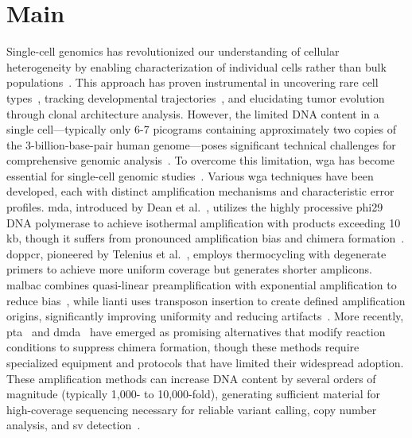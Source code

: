 \documentclass[pdflatex,sn-nature,lineno]{sn-jnl}%
\theoremstyle{thmstyleone}%
\theoremstyle{thmstyletwo}%
\theoremstyle{thmstylethree}%
\begin{document}
\maketitle

\section*{Main}\label{sec:main}

Single-cell genomics has revolutionized our understanding of cellular heterogeneity by enabling characterization of individual cells rather than bulk populations~\cite{kalef2024single,sun2024mapping,navin2011tumour,macaulay2014single}.
This approach has proven instrumental in uncovering rare cell types~\cite{macaulay2014single}, tracking developmental trajectories~\cite{navin2011tumour}, and elucidating tumor evolution through clonal architecture analysis.
However, the limited DNA content in a single cell—typically only 6-7 picograms containing approximately two copies of the 3-billion-base-pair human genome—poses significant technical challenges for comprehensive genomic analysis~\cite{leung2016highly,gawad2016single,chen2017singlecell}.
To overcome this limitation, \gls{wga} has become essential for single-cell genomic studies~\cite{zong2012genome,huang2015single,dean2002comprehensive,chen2017singlecell,macaulay2014single}.
Various \gls{wga} techniques have been developed, each with distinct amplification mechanisms and characteristic error profiles.
\gls{mda}, introduced by Dean et al.~\cite{dean2002comprehensive}, utilizes the highly processive phi29 DNA polymerase to achieve isothermal amplification with products exceeding 10 kb, though it suffers from pronounced amplification bias and chimera formation~\cite{lasken2007mechanism,pinard2006assessment}.
\gls{doppcr}, pioneered by Telenius et al.~\cite{telenius1992degenerate}, employs thermocycling with degenerate primers to achieve more uniform coverage but generates shorter amplicons.
\gls{malbac} combines quasi-linear preamplification with exponential amplification to reduce bias~\cite{zong2012genome}, while \gls{lianti} uses transposon insertion to create defined amplification origins, significantly improving uniformity and reducing artifacts~\cite{chen2017singlecell}.
More recently, \gls{pta}~\cite{gonzalez-pena2021accurate} and \gls{dmda}~\cite{hard2023longread, dippenaar2024droplet} have emerged as promising alternatives that modify reaction conditions to suppress chimera formation, though these methods require specialized equipment and protocols that have limited their widespread adoption.
These amplification methods can increase DNA content by several orders of magnitude (typically 1,000- to 10,000-fold), generating sufficient material for high-coverage sequencing necessary for reliable variant calling, copy number analysis, and \gls{sv} detection~\cite{macaulay2014single,de2014quantitative, biezuner2021comparison,fu2015uniform,agyabeng2025evaluating,dean2001rapid}.
\end{document}
